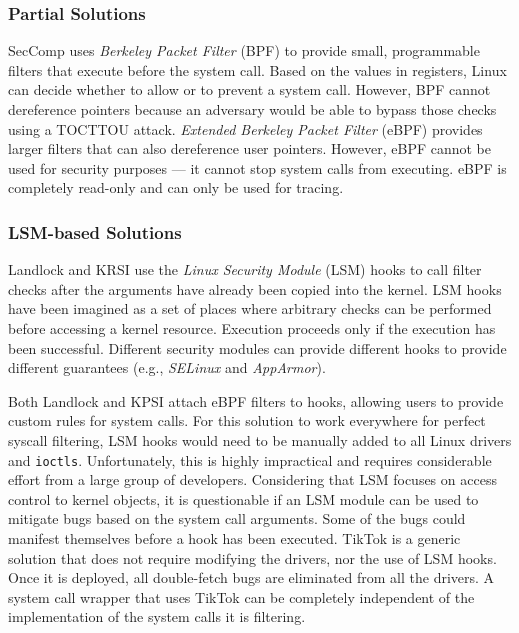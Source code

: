 \subsubsection{Partial Solutions}
SecComp\cite{seccomp} uses \emph{Berkeley Packet Filter} (BPF) to provide small,
programmable filters that execute before the system call. Based on the values
in registers, Linux can decide whether to allow or to prevent a system call.
However, BPF cannot dereference pointers because an adversary would be able to
bypass those checks using a TOCTTOU attack. \emph{Extended Berkeley Packet
Filter} (eBPF)\cite{ebpf} provides larger filters that can also dereference
user pointers. However, eBPF cannot be used for security purposes --- it cannot
stop system calls from executing. eBPF is completely read-only and can only be
used for tracing.

\subsubsection{LSM-based Solutions}
Landlock\cite{landlock} and KRSI\cite{krsi} use the \emph{Linux Security Module}
\cite{morris2002linux} (LSM) hooks to call filter checks after the arguments
have already been copied into the kernel. LSM hooks have been imagined as a set
of places where arbitrary checks can be performed before accessing a kernel
resource. Execution proceeds only if the execution has been successful.
Different security modules can provide different hooks to provide different
guarantees (e.g., \emph{SELinux}\cite{smalley2001implementing} and
\emph{AppArmor}\cite{gruenbacher2007apparmor}).

Both Landlock and KPSI attach eBPF filters to hooks, allowing users to provide
custom rules for system calls. For this solution to work everywhere for perfect
syscall filtering, LSM hooks would need to be manually added to all Linux
drivers and \texttt{ioctls}. Unfortunately, this is highly impractical and requires
considerable effort from a large group of developers. Considering that LSM
focuses on access control to kernel objects, it is questionable if an LSM module
can be used to mitigate bugs based on the system call arguments. Some of the
bugs could manifest themselves before a hook has been executed. TikTok is a
generic solution that does not require modifying the drivers, nor the use of
LSM hooks. Once it is deployed, all double-fetch bugs are eliminated from all
the drivers. A system call wrapper that uses TikTok can be completely
independent of the implementation of the system calls it is filtering.

